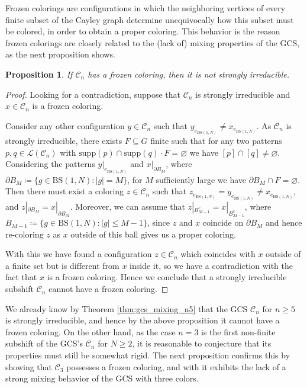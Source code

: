 \documentclass[letterpaper,10pt]{amsart}
\theoremstyle{plain}
\newtheorem{proposition}[theorem]{Proposition}
\newcommand{\BS}[1][N]{\mathrm{BS}(1,#1)}
\begin{document}
Frozen colorings are configurations in which the neighboring vertices of every finite subset of the Cayley graph determine unequivocally how this subset must be colored, in order to obtain a proper coloring. This behavior is the reason frozen colorings are closely related to the (lack of) mixing properties of the GCS, as the next proposition shows.
\begin{proposition} \label{prop:froz_col_not_si} If $\mathcal{C}_n$ has a frozen coloring, then it is not strongly irreducible.
\end{proposition}
\begin{proof}
	
	Looking for a contradiction, suppose that $\mathcal{C}_n$ is strongly irreducible and $x\in \mathcal{C}_n$ is a frozen coloring. 
	
	Consider any other configuration $y\in \mathcal{C}_n$ such that $y_{e_{\BS}}\neq x_{e_{\BS}}$. As $\mathcal{C}_n$ is strongly irreducible, there exists $F\subseteq G$ finite such that for any two patterns $p,q\in \mathcal{L}(\mathcal{C}_n)$ with $\mathrm{supp}(p)\cap \mathrm{supp}(q)\cdot F=\varnothing$ we have $[p]\cap [q]\neq \varnothing$. Considering the patterns $y|_{e_{\BS}}$ and $x|_{\partial B_M}$, where $\partial B_M\coloneqq \{g\in \BS: |g|=M\}$, for $M$ sufficiently large we have $\partial B_M \cap F= \varnothing$. Then there must exist a coloring $z\in \mathcal{C}_n$ such that $z_{e_{\BS}}=y_{e_{\BS}}\neq x_{e_{\BS}}$, and $z|_{\partial B_M}=x|_{\partial B_M}$. Moreover, we can assume that $z|_{B_{M-1}^c}=x|_{B_{M-1}^c}$, where $B_{M-1}\coloneqq \{g\in \BS: |g|\le M-1 \}$, since $z$ and $x$ coincide on $\partial B_M$ and hence re-coloring $z$ as $x$ outside of this ball gives us a proper coloring. 
	
	With this we have found a configuration $z\in \mathcal{C}_n$ which coincides with $x$ outside of a finite set but is different from $x$ inside it, so we have a contradiction with the fact that $x$ is a frozen coloring. Hence we conclude that a strongly irreducible subshift $\mathcal{C}_n$ cannot have a frozen coloring.
\end{proof}
We already know by Theorem \ref{thm:gcs_mixing_n5} that the GCS $\mathcal{C}_n$ for $n\ge 5$ is strongly irreducible, and hence by the above proposition it cannot have a frozen coloring. On the other hand, as the case $n=3$ is the first non-finite subshift of the GCS's $\mathcal{C}_n$ for $N\ge 2$, it is reasonable to conjecture that its properties must still be somewhat rigid. The next proposition confirms this by showing that $\mathcal{C}_3$ possesses a frozen coloring, and with it exhibits the lack of a strong mixing behavior of the GCS with three colors.
\end{document}
